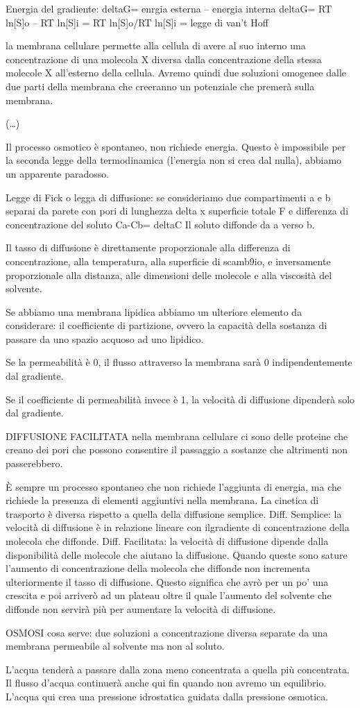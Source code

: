 \documentclass[]{article}
\begin{document}
Energia del gradiente: deltaG= enrgia esterna -- energia interna deltaG=
RT ln{[}S{]}o -- RT ln{[}S{]}i = RT ln{[}S{]}o/RT ln{[}S{]}i = legge di
van't Hoff

la membrana cellulare permette alla cellula di avere al suo interno una
concentrazione di una molecola X diversa dalla concentrazione della
stessa molecole X all'esterno della cellula. Avremo quindi due soluzioni
omogenee dalle due parti della membrana che creeranno un potenziale che
premerà sulla membrana.

(\ldots{})

Il processo osmotico è spontaneo, non richiede energia. Questo è
impossibile per la seconda legge della termodinamica (l'energia non si
crea dal nulla), abbiamo un apparente paradosso.

Legge di Fick o legga di diffusione: se consideriamo due compartimenti a
e b separai da parete con pori di lunghezza delta x superficie totale F
e differenza di concentrazione del soluto Ca-Cb= deltaC Il soluto
diffonde da a verso b.

Il tasso di diffusione è direttamente proporzionale alla differenza di
concentrazione, alla temperatura, alla superficie di scamb9io, e
inversamente proporzionale alla distanza, alle dimensioni delle molecole
e alla viscosità del solvente.

Se abbiamo una membrana lipidica abbiamo un ulteriore elemento da
considerare: il coefficiente di partizione, ovvero la capacità della
sostanza di passare da uno spazio acquoso ad uno lipidico.

Se la permeabilità è 0, il flusso attraverso la membrana sarà 0
indipendentemente dal gradiente.

Se il coefficiente di permeabilità invece è 1, la velocità di diffusione
dipenderà solo dal gradiente.

DIFFUSIONE FACILITATA nella membrana cellulare ci sono delle proteine
che creano dei pori che possono consentire il passaggio a sostanze che
altrimenti non passerebbero.

È sempre un processo spontaneo che non richiede l'aggiunta di energia,
ma che richiede la presenza di elementi aggiuntivi nella membrana. La
cinetica di trasporto è diversa rispetto a quella della diffusione
semplice. Diff. Semplice: la velocità di diffusione è in relazione
lineare con ilgradiente di concentrazione della molecola che diffonde.
Diff. Facilitata: la velocità di diffusione dipende dalla disponibilità
delle molecole che aiutano la diffusione. Quando queste sono sature
l'aumento di concentrazione della molecola che diffonde non incrementa
ulteriormente il tasso di diffusione. Questo significa che avrò per un
po' una crescita e poi arriverò ad un plateau oltre il quale l'aumento
del solvente che diffonde non servirà più per aumentare la velocità di
diffusione.

OSMOSI cosa serve: due soluzioni a concentrazione diversa separate da
una membrana permeabile al solvente ma non al soluto.

L'acqua tenderà a passare dalla zona meno concentrata a quella più
concentrata. Il flusso d'acqua continuerà anche qui fin quando non
avremo un equilibrio. L'acqua qui crea una pressione idrostatica guidata
dalla pressione osmotica.
\end{document}

